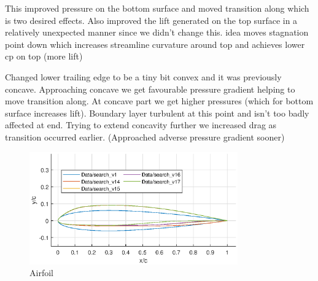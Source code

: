 \documentclass{article}
\begin{document}
This improved pressure on the bottom surface and moved transition along which is two desired effects.
Also improved the lift generated on the top surface in a relatively unexpected manner since we didn't change this.
idea moves stagnation point down which increases streamline curvature around top and achieves lower cp on top (more lift)

Changed lower trailing edge to be a tiny bit convex and it was previously concave. 
Approaching concave we get favourable pressure gradient helping to move transition along. 
At concave part we get higher pressures (which for bottom surface increases lift).
Boundary layer turbulent at this point and isn't too badly affected at end. 
Trying to extend concavity further we increased drag as transition occurred earlier. (Approached adverse pressure gradient sooner)


\begin{figure}[H]
    \centering
    \includegraphics[width=0.8\textwidth]{figures/hiRe_geometry_17.eps}
    \caption{Airfoil}
    \label{fig:v17_geometry}
\end{figure}
\end{document}
